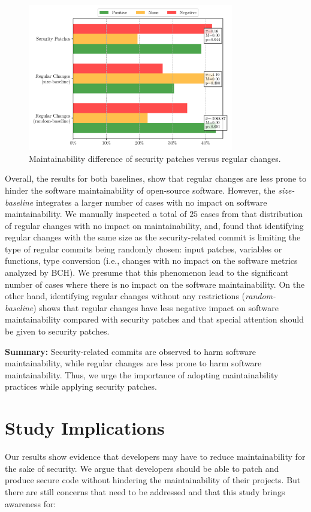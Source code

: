 \documentclass[smallextended]{svjour3}       %
\begin{document}
\begin{figure}[htp]
  \centering
  \includegraphics[width=0.8\textwidth]{figures/baseline.pdf}
  \caption{Maintainability difference of security patches versus regular changes.}
  \label{fig:secvsreg}    
\end{figure}

Overall, the results for both baselines, show that regular 
changes are less prone to hinder the software 
maintainability of open-source software.   
However, the \emph{size-baseline} integrates a larger 
number of cases with no impact on software maintainability. 
We manually inspected a total of $25$ cases from
that distribution of regular changes with no impact on maintainability, 
and, found that identifying regular changes with the same 
size as the security-related commit is limiting the type of regular 
commits being randomly chosen: input 
patches, variables or functions, type conversion (i.e., changes
with no impact on the software metrics analyzed by BCH).
We presume that this phenomenon lead
to the significant number of cases where there is no impact
on the software maintainability. On the other hand, 
identifying regular changes without any restrictions (\emph{random-baseline})
shows that regular changes have less negative impact 
on software maintainability compared with security patches
and that special attention should be given to security patches.

\textbf{Summary:} Security-related commits are observed to harm software 
maintainability, while regular changes are less prone to harm software maintainability.
Thus, we urge the importance of adopting maintainability practices while 
applying security patches.



\section{Study Implications}\label{sec:implications}
%
Our results show evidence that developers may have to reduce maintainability for the 
sake of security. We argue that developers should be able to patch and produce 
secure code without hindering the maintainability of their projects. But there are 
still concerns that need to be addressed and that this study brings awareness for:
%
\end{document}
